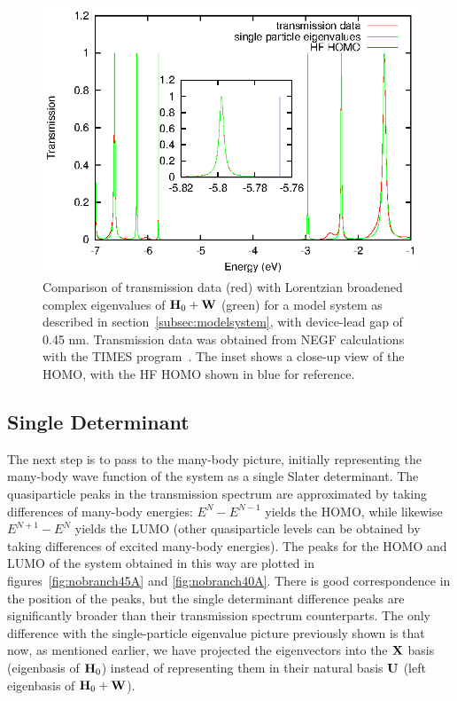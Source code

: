 \begin{figure} 
	\begin{center}
		\includegraphics[width=0.9\linewidth]{figures/13evals}
	\end{center}
	\caption{Comparison of transmission data (red) with Lorentzian
	broadened complex eigenvalues of $\mathbf{H}_0 + \mathbf{W}$ (green) for a
	model system as described in section~\ref{subsec:modelsystem}, with
	device-lead gap of 0.45 nm. Transmission data was obtained from
	\ac{NEGF} calculations with the TIMES program~\cite{times}.
	The inset shows a close-up view of the \ac{HOMO}, with the HF \ac{HOMO}
	shown in blue for reference.
	}
	\label{fig:13evals}
\end{figure}

\subsection{Single Determinant}
\label{subsec:SingleDeterminant}

The next step is to pass to the many-body picture, initially representing the
many-body wave function of the system as a single Slater determinant. The
quasiparticle peaks in the transmission spectrum are approximated by taking
differences of many-body energies: $E^N - E^{N-1}$ yields the \ac{HOMO}, while
likewise $E^{N+1} - E^N$ yields the \ac{LUMO} (other quasiparticle levels can be
obtained by taking differences of excited many-body energies). The peaks for
the \ac{HOMO} and \ac{LUMO} of the system obtained in this way are plotted in
figures~\ref{fig:nobranch45A} and \ref{fig:nobranch40A}. There is good
correspondence in the position of the peaks, but the single determinant
difference peaks are significantly broader than their transmission spectrum
counterparts. The only difference with the single-particle eigenvalue picture
previously shown is that now, as mentioned earlier, we have projected the
eigenvectors into the $\mathbf{X}$ basis (eigenbasis of $\mathbf{H}_0$) instead of
representing them in their natural basis $\mathbf{U}$ (left eigenbasis of
$\mathbf{H}_0 + \mathbf{W}$).

